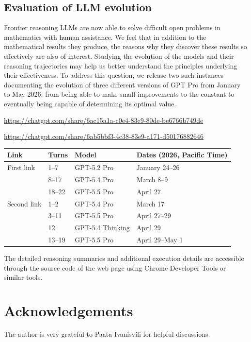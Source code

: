 \documentclass[a4paper,twoside,11pt,reqno]{amsart}
\theoremstyle{definition}
\theoremstyle{remark}
\newcommand{\1}{\mathbbm{1}}
\begin{document}
\subsection{Evaluation of LLM evolution}
Frontier reasoning LLMs are now able to solve difficult open problems in mathematics with human assistance. We feel that in addition to the mathematical results they produce, the reasons why they discover these results so effectively are also of interest. Studying the evolution of the models and their reasoning trajectories may help us better understand the principles underlying their effectiveness. To address this question, we release two such instances documenting the evolution of three different versions of GPT Pro from January to May 2026, from being able to make small improvements to the constant to eventually being capable of determining its optimal value.

\begin{flushleft}
\url{https://chatgpt.com/share/6ac15a1a-c0e4-83e9-80de-be6766b749de}\par
\smallskip
\url{https://chatgpt.com/share/6ab5bbf3-4c38-83e9-a171-d50176882646}
\end{flushleft}

\begin{center}
\small
\renewcommand{\arraystretch}{1.15}
\begin{tabular}{@{}llll@{}}
\toprule
\textbf{Link} & \textbf{Turns} & \textbf{Model} & \textbf{Dates (2026, Pacific Time)} \\
\midrule
First link & 1--7 & GPT-5.2 Pro & January 24--26 \\
 & 8--17 & GPT-5.4 Pro & March 8--9 \\
 & 18--22 & GPT-5.5 Pro & April 27 \\
\addlinespace
Second link & 1--2 & GPT-5.4 Pro & March 17 \\
 & 3--11 & GPT-5.5 Pro & April 27--29 \\
 & 12 & GPT-5.4 Thinking & April 29 \\
 & 13--19 & GPT-5.5 Pro & April 29--May 1 \\
\bottomrule
\end{tabular}
\end{center}

The detailed reasoning summaries and additional execution details are accessible through the source code of the web page using Chrome Developer Tools or similar tools.

\section*{Acknowledgements}
The author is very grateful to Paata Ivanisvili for helpful discussions.
\end{document}
